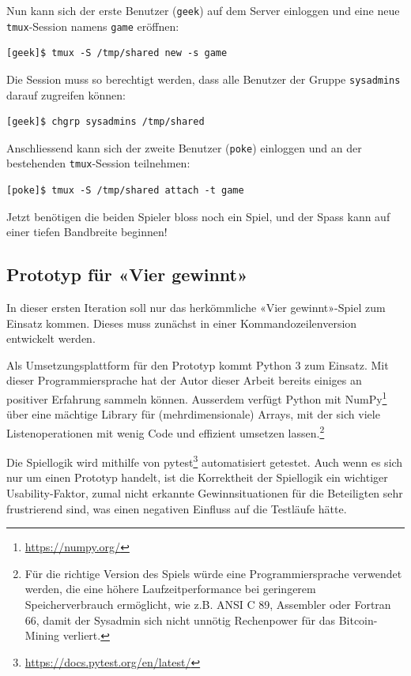 \documentclass[a4paper,11pt,hidelinks]{scrartcl}
\begin{document}
Nun kann sich der erste Benutzer (\texttt{geek}) auf dem Server einloggen und eine neue \texttt{tmux}-Session namens \texttt{game} eröffnen:

\begin{lstlisting}
[geek]$ tmux -S /tmp/shared new -s game
\end{lstlisting}

Die Session muss so berechtigt werden, dass alle Benutzer der Gruppe \texttt{sysadmins} darauf zugreifen können:

\begin{lstlisting}
[geek]$ chgrp sysadmins /tmp/shared
\end{lstlisting}

Anschliessend kann sich der zweite Benutzer (\texttt{poke}) einloggen und an der bestehenden \texttt{tmux}-Session teilnehmen:

\begin{lstlisting}
[poke]$ tmux -S /tmp/shared attach -t game
\end{lstlisting}

Jetzt benötigen die beiden Spieler bloss noch ein Spiel, und der Spass kann auf einer tiefen Bandbreite beginnen!

\subsection{Prototyp für «Vier gewinnt»}

In dieser ersten Iteration soll nur das herkömmliche «Vier gewinnt»-Spiel zum Einsatz kommen. Dieses muss zunächst in einer Kommandozeilenversion entwickelt werden.

Als Umsetzungsplattform für den Prototyp kommt Python 3 zum Einsatz. Mit dieser Programmiersprache hat der Autor dieser Arbeit bereits einiges an positiver Erfahrung sammeln können. Ausserdem verfügt Python mit NumPy\footnote{\url{https://numpy.org/}} über eine mächtige Library für (mehrdimensionale) Arrays, mit der sich viele Listenoperationen mit wenig Code und effizient umsetzen lassen.\footnote{Für die richtige Version des Spiels würde eine Programmiersprache verwendet werden, die eine höhere Laufzeitperformance bei geringerem Speicherverbrauch ermöglicht, wie z.B. ANSI C 89, Assembler oder Fortran 66, damit der Sysadmin sich nicht unnötig Rechenpower für das Bitcoin-Mining verliert.}

Die Spiellogik wird mithilfe von pytest\footnote{\url{https://docs.pytest.org/en/latest/}} automatisiert getestet. Auch wenn es sich nur um einen Prototyp handelt, ist die Korrektheit der Spiellogik ein wichtiger Usability-Faktor, zumal nicht erkannte Gewinnsituationen für die Beteiligten sehr frustrierend sind, was einen negativen Einfluss auf die Testläufe hätte.
\end{document}
